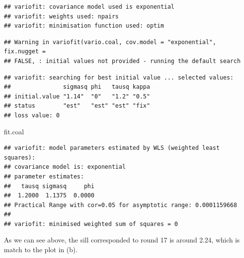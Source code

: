 \documentclass[]{article}
\newenvironment{Shaded}{\begin{snugshade}}{\end{snugshade}}
\newcommand{\NormalTok}[1]{#1}
\begin{document}
\begin{verbatim}
## variofit: covariance model used is exponential 
## variofit: weights used: npairs 
## variofit: minimisation function used: optim
\end{verbatim}

\begin{verbatim}
## Warning in variofit(vario.coal, cov.model = "exponential", fix.nugget =
## FALSE, : initial values not provided - running the default search
\end{verbatim}

\begin{verbatim}
## variofit: searching for best initial value ... selected values:
##               sigmasq phi   tausq kappa
## initial.value "1.14"  "0"   "1.2" "0.5"
## status        "est"   "est" "est" "fix"
## loss value: 0
\end{verbatim}

\begin{Shaded}
\begin{Highlighting}[]
\NormalTok{fit.coal}
\end{Highlighting}
\end{Shaded}

\begin{verbatim}
## variofit: model parameters estimated by WLS (weighted least squares):
## covariance model is: exponential
## parameter estimates:
##   tausq sigmasq     phi 
##  1.2000  1.1375  0.0000 
## Practical Range with cor=0.05 for asymptotic range: 0.0001159668
## 
## variofit: minimised weighted sum of squares = 0
\end{verbatim}

As we can see above, the sill corresponded to round 17 is around 2.24,
which is match to the plot in (b).
\end{document}
